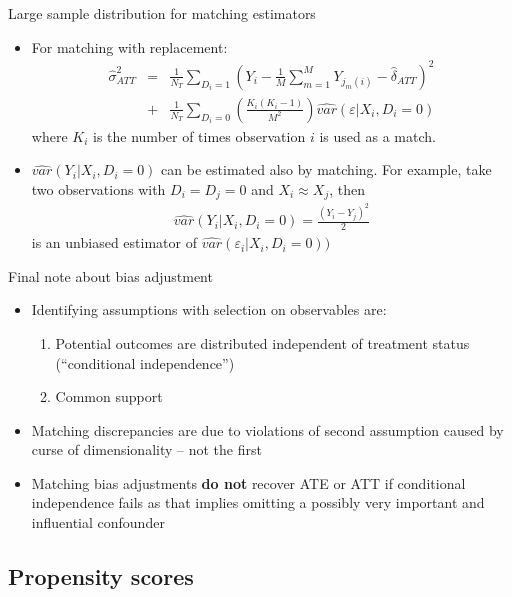 \documentclass{beamer}
\begin{document}
\begin{frame}{Large sample distribution for matching estimators}
	
	\begin{itemize}
	\item For matching with replacement:
		\begin{eqnarray*}
		\widehat{\sigma}^2_{ATT} &=& \frac{1}{N_T} \sum_{D_i=1} \left( Y_i - \frac{1}{M} \sum_{m=1}^M Y_{j_m(i)} - \widehat{\delta}_{ATT} \right)^2 \\
		&+& \frac{1}{N_T} \sum_{D_i=0} \left( \frac{K_i(K_i-1)}{M^2} \right) \widehat{var}(\varepsilon | X_i,D_i=0)
		\end{eqnarray*}where $K_i$ is the number of times observation $i$ is used as a match.
	\item $\widehat{var}(Y_i | X_i,D_i=0)$ can be estimated also by matching.  For example, take two observations with $D_i=D_j=0$ and $X_i \approx X_j$, then
		\begin{eqnarray*}
		\widehat{var}(Y_i | X_i,D_i=0) = \frac{(Y_i-Y_j)^2}{2}
		\end{eqnarray*}is an unbiased estimator of $\widehat{var}(\varepsilon_i | X_i,D_i=0))$
	\end{itemize}
\end{frame}

\begin{frame}{Final note about bias adjustment}

\begin{itemize}
\item Identifying assumptions with selection on observables are:
	\begin{enumerate}
	\item Potential outcomes are distributed independent of treatment status (``conditional independence'')
	\item Common support
	\end{enumerate}
\item Matching discrepancies are due to violations of second assumption caused by curse of dimensionality -- not the first
\item Matching bias adjustments \textbf{do not} recover ATE or ATT if conditional independence fails as that implies omitting a possibly very important and influential confounder
\end{itemize}

\end{frame}
	

		  
\subsection{Propensity scores}
\end{document}
